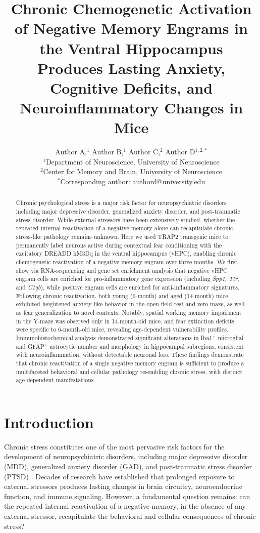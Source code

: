 \documentclass[11pt]{article}
\title{Chronic Chemogenetic Activation of Negative Memory Engrams in the Ventral Hippocampus Produces Lasting Anxiety, Cognitive Deficits, and Neuroinflammatory Changes in Mice}
\author{Author A,$^{1}$ Author B,$^{1}$ Author C,$^{2}$ Author D$^{1,2,*}$\\
\small $^{1}$Department of Neuroscience, University of Neuroscience\\
\small $^{2}$Center for Memory and Brain, University of Neuroscience\\
\small $^{*}$Corresponding author: authord@university.edu}
\date{}
\begin{document}
\maketitle

\begin{abstract}
Chronic psychological stress is a major risk factor for neuropsychiatric disorders including major depressive disorder, generalized anxiety disorder, and post-traumatic stress disorder. While external stressors have been extensively studied, whether the repeated internal reactivation of a negative memory alone can recapitulate chronic-stress-like pathology remains unknown. Here we used TRAP2 transgenic mice to permanently label neurons active during contextual fear conditioning with the excitatory DREADD hM3Dq in the ventral hippocampus (vHPC), enabling chronic chemogenetic reactivation of a negative memory engram over three months. We first show via RNA-sequencing and gene set enrichment analysis that negative vHPC engram cells are enriched for pro-inflammatory gene expression (including \textit{Spp1}, \textit{Ttr}, and \textit{C1qb}), while positive engram cells are enriched for anti-inflammatory signatures. Following chronic reactivation, both young (6-month) and aged (14-month) mice exhibited heightened anxiety-like behavior in the open field test and zero maze, as well as fear generalization to novel contexts. Notably, spatial working memory impairment in the Y-maze was observed only in 14-month-old mice, and fear extinction deficits were specific to 6-month-old mice, revealing age-dependent vulnerability profiles. Immunohistochemical analysis demonstrated significant alterations in Iba1$^+$ microglial and GFAP$^+$ astrocytic number and morphology in hippocampal subregions, consistent with neuroinflammation, without detectable neuronal loss. These findings demonstrate that chronic reactivation of a single negative memory engram is sufficient to produce a multifaceted behavioral and cellular pathology resembling chronic stress, with distinct age-dependent manifestations.
\end{abstract}

\section{Introduction}

Chronic stress constitutes one of the most pervasive risk factors for the development of neuropsychiatric disorders, including major depressive disorder (MDD), generalized anxiety disorder (GAD), and post-traumatic stress disorder (PTSD) \citep{kendler2001causal, mcewen2007physiology}. Decades of research have established that prolonged exposure to external stressors produces lasting changes in brain circuitry, neuroendocrine function, and immune signaling. However, a fundamental question remains: can the repeated internal reactivation of a negative memory, in the absence of any external stressor, recapitulate the behavioral and cellular consequences of chronic stress?
\end{document}
